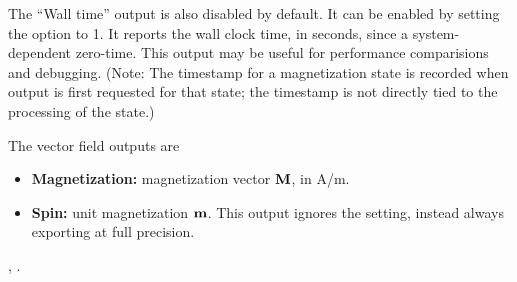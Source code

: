 \begin{description}
The ``Wall time'' output is also disabled by default.  It can be enabled
by setting the  option to 1.  It reports
the wall clock time, in seconds, since a system-dependent zero-time.
This output may be useful for performance comparisions and
debugging. (Note: The timestamp for a magnetization state is recorded
when output is first requested for that state; the timestamp is not
directly tied to the processing of the state.)

The vector field outputs are
\begin{itemize}
\item \textbf{Magnetization:} magnetization vector $\textbf{M}$, in A/m.
\item \textbf{Spin:} unit magnetization $\textbf{m}$.  This output ignores the
  setting, instead
always exporting at full precision.
\end{itemize}

\begin{ExampleMifs}
  , .
\end{ExampleMifs}


\end{description}
